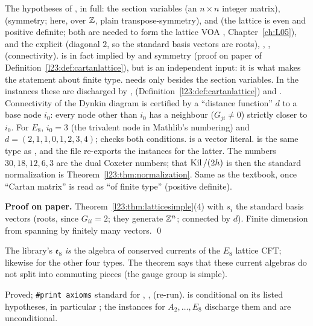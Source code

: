 \begin{dictionary}
The hypotheses of , in full: the section variables  (an $n\times n$ integer matrix),
 (symmetry; here, over ${\mathbb{Z}}$, plain transpose-symmetry),  and
 (the lattice is even and positive definite; both are needed to form the lattice VOA
, Chapter~\ref{ch:L05}), and the explicit  (diagonal $2$, so the standard basis vectors are roots),
, ,  (connectivity).  is in fact implied by  and symmetry (proof on paper of Definition~\ref{l23:def:cartanlattice}), but
 is an independent input: it is what makes the statement about finite type.  needs only
 besides the section variables. In the instances these are discharged by , 
(Definition~\ref{l23:def:cartanlattice}) and .
Connectivity of the Dynkin diagram is certified by a ``distance function'' $d$ to a base node $i_0$: every node other than $i_0$ has a
neighbour ($G_{ji}\ne0$) strictly closer to $i_0$. For $E_8$, $i_0=3$ (the trivalent node in Mathlib's numbering) and
$d=(2,1,1,0,1,2,3,4)$;  checks both conditions. \lean{![…]} is a vector literal.  is the same type
as , and the file re-exports the instances for the latter. The numbers $30,18,12,6,3$ are the dual Coxeter
numbers; that $\operatorname{Kil}/(2h)$ is then the standard normalization is Theorem~\ref{l23:thm:normalization}. Same as the textbook,
once ``Cartan matrix'' is read as ``of finite type'' (positive definite).
\end{dictionary}

\textbf{Proof on paper.} Theorem~\ref{l23:thm:latticesimple}(4) with $s_i$ the standard basis vectors (roots, since $G_{ii}=2$; they
generate ${\mathbb{Z}}^n$; connected by $d$). Finite dimension from spanning by finitely many vectors. \qed

\begin{physics}
The library's $\mathfrak e_8$ \emph{is} the algebra of conserved currents of the $E_8$ lattice CFT; likewise for the other four types.
The theorem says that these current algebras do not split into commuting pieces (the gauge group is simple).
\end{physics}

\begin{status}
Proved; \texttt{\#print axioms} standard for , ,
 (re-run).  is conditional on its listed hypotheses, in particular ;
the instances for $A_2,\dots,E_8$ discharge them and are unconditional.
\end{status}

